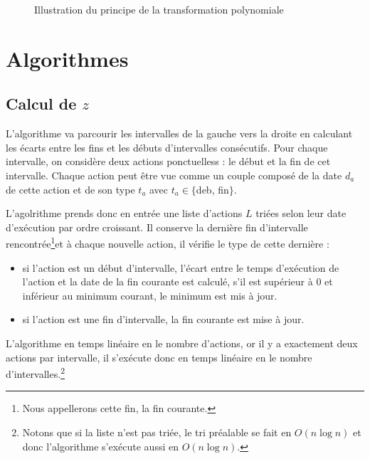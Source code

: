 \documentclass[a4paper,9pt]{report}
\begin{document}
\begin{ex}
\begin{figure}
\begin{center}
\begin{minipage}[c][5cm][c]{0.55\linewidth}
        \end{minipage}
    \end{center}
    \caption{Illustration du principe de la transformation polynomiale}
    \label{fig_transpoly_bis}
\end{figure}
\end{ex}

\newpage
\appendix
\appendixpageoff
\chapter{Algorithmes}
\section{Calcul de $z$}
L'algorithme va parcourir les intervalles de la gauche vers la droite en calculant les écarts entre
les fins et les débuts d'intervalles consécutifs. Pour chaque intervalle, on considère deux
actions ponctuelless : le début et la fin de cet intervalle. Chaque action peut être vue comme un
couple composé de la date $d_a$ de cette action et de son type $t_a$ avec $t_a \in \{$deb, fin$\}$.

L'agolrithme prends donc en entrée une liste d'actions $L$ triées selon leur date d'exécution par ordre
croissant. Il conserve la dernière fin d'intervalle rencontrée\footnote{Nous appellerons cette fin,
la fin courante.}et à chaque nouvelle action, il vérifie le type de cette dernière :
\begin{itemize}
    \item si l'action est un début d'intervalle, l'écart entre le temps d'exécution de l'action et
        la date de la fin courante est calculé, s'il est supérieur à $0$ et inférieur au minimum
        courant, le minimum est mis à jour. 
    \item si l'action est une fin d'intervalle, la fin courante est mise à jour.
\end{itemize}

L'algorithme en temps linéaire en le nombre d'actions, or il y a exactement deux actions par
intervalle, il s'exécute donc en temps linéaire en le nombre d'intervalles.\footnote{Notons que si
    la liste n'est pas triée, le tri préalable se fait en $O(n \log n)$ et donc l'algorithme
s'exécute aussi en $O(n \log n)$.}
\end{document}
